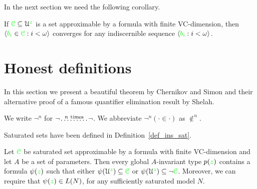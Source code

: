 In the next section we need the following corollary.

\begin{corollary}\label{corol_altrank}
If ${\color{green}\EuScript C}\subseteq\EuScript U^{\color{green} z}$ is a set approximable by a formula with finite VC-dimension, then $\langle{\color{green}b_i}\in{\color{green}\EuScript C}:i<\omega\rangle$ converges for any indiscernible sequence $\langle{\color{green}b_i}:i<\omega\rangle$.
\end{corollary}



  




\section{Honest definitions}
\label{honest}

In this section we present a beautiful theorem by Chernikov and Simon and their alternative proof of a famous quantifier elimination result by Shelah. 

We write \emph{$\neg^n$\/} for $\neg\!\stackrel{n\ \rm times}{\dots\dots\dots}\!\neg$.
We abbreviate $\neg^n(\cdot\in\cdot)$ as \emph{$\notin^n$}.

Saturated sets have been defined in Definition~\ref{def_ins_sat}. 

\begin{lemma}\label{lem_honest}
Let ${\color{green}\EuScript C}$ be saturated set approximable by a formula with finite VC-dimension and let $A$ be a set of parameters.
Then every global $A$-invariant type $p({\color{green} z})$ contains a formula $\psi({\color{green} z})$ such that either $\psi(\EuScript U^{\color{green} z})\subseteq{\color{green}\EuScript C}$ or $\psi(\EuScript U^{\color{green} z})\subseteq\neg{\color{green}\EuScript C}$.
Moreover, we can require that $\psi({\color{green} z})\in L(N)$, for any sufficiently saturated model $N$.
\end{lemma}


